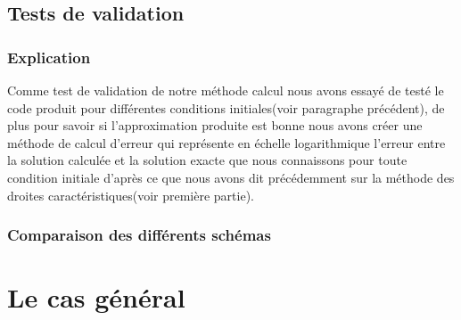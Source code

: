 \documentclass[12pt]{article}
\begin{document}
\subsection{Tests de validation}
\subsubsection{Explication}
Comme test de validation de notre méthode calcul nous avons essayé de testé le code produit pour différentes conditions initiales(voir paragraphe précédent), de plus pour savoir si l'approximation produite est bonne nous avons créer une méthode de calcul d'erreur qui représente en échelle logarithmique l'erreur entre la solution calculée et la solution exacte que nous connaissons pour toute condition initiale d'après ce que nous avons dit précédemment sur la méthode des droites caractéristiques(voir première partie).
\subsubsection{Comparaison des différents schémas}
\section{Le cas général}
\end{document}
